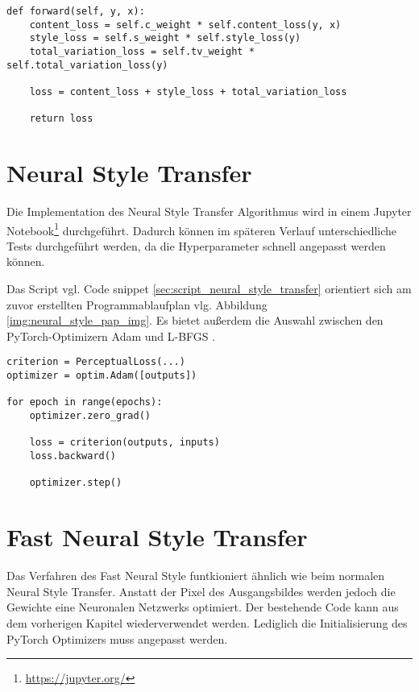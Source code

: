 \begin{listing}[ht]
\begin{verbatim}
def forward(self, y, x):
    content_loss = self.c_weight * self.content_loss(y, x)
    style_loss = self.s_weight * self.style_loss(y)
    total_variation_loss = self.tv_weight * self.total_variation_loss(y)

    loss = content_loss + style_loss + total_variation_loss

    return loss
\end{verbatim}
\end{listing}

\section{Neural Style Transfer}

Die Implementation des Neural Style Transfer Algorithmus wird in einem Jupyter Notebook\footnote{\url{https://jupyter.org/}} durchgeführt. 
Dadurch können im späteren Verlauf unterschiedliche Tests durchgeführt werden, da die Hyperparameter schnell angepasst werden können.

Das Script vgl. Code snippet \ref{sec:script_neural_style_transfer} orientiert sich am zuvor erstellten Programmablaufplan vlg. Abbildung \ref{img:neural_style_pap_img}. Es bietet außerdem die Auswahl zwischen den PyTorch-Optimizern Adam und L-BFGS \cite{Liu1989}.

\begin{listing}[ht]
\begin{verbatim}
criterion = PerceptualLoss(...)
optimizer = optim.Adam([outputs])

for epoch in range(epochs):
    optimizer.zero_grad()

    loss = criterion(outputs, inputs)
    loss.backward()

    optimizer.step()    
\end{verbatim}
\end{listing}

\section{Fast Neural Style Transfer}

Das Verfahren des Fast Neural Style funtkioniert ähnlich wie beim normalen Neural Style Transfer.
Anstatt der Pixel des Ausgangsbildes werden jedoch die Gewichte eine Neuronalen Netzwerks optimiert.
Der bestehende Code kann aus  dem vorherigen Kapitel wiederverwendet werden. 
Lediglich die Initialisierung des PyTorch Optimizers muss angepasst werden.

